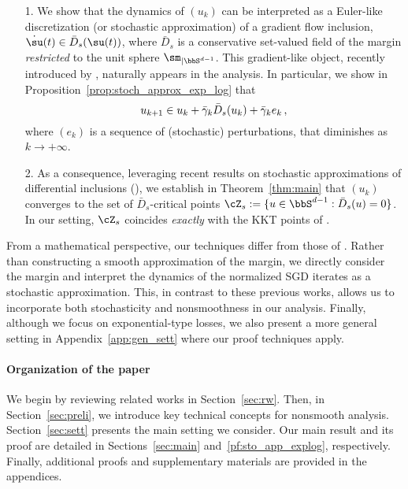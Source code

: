 \begin{itemize}
\item[1.] We show that the dynamics of $(u_k)$ can be interpreted as a Euler-like discretization (or stochastic approximation) of a 
gradient flow inclusion, $\dot{\su}(t) \in  \bar{D}_s(\su(t))$, where $\bar{D}_s$ is a conservative set-valued field of the margin \emph{restricted} to the unit sphere $\sm_{|\bbS^{d-1}}$. This gradient-like object, recently introduced by \cite{bolte2021conservative}, naturally appears in the analysis.
 In particular, we show in Proposition~\ref{prop:stoch_approx_exp_log} that
\begin{equation}\label{eq:sto_appro_intro}
  u_{k+1} \in  u_k + \bar{\gamma}_k \bar{D}_s(u_k) + \bar{\gamma}_k e_k\, ,
\end{equation}
where $(e_k)$ is a sequence of (stochastic) perturbations, that diminishes as $k \rightarrow + \infty$.
\item[2.] As a consequence, leveraging recent results on stochastic approximations of differential inclusions (\cite{benaim2006dynamics,dav-dru-kak-lee-19,bolte2021conservative}), we establish in Theorem~\ref{thm:main} that $(u_k)$ converges to the set of $\bar{D}_s$-critical points $\cZ_s := \{u \in \bbS^{d-1}: \bar{D}_s(u) = 0 \}$. In our setting, $\cZ_s$ coincides \emph{exactly} with the KKT points of \cite{Lyu_Li_maxmargin}.
\end{itemize}
From a mathematical perspective, our techniques differ from those of \cite{Lyu_Li_maxmargin,ji2020directional}. 
Rather than constructing a smooth approximation of the margin, we directly consider the margin and interpret the dynamics of the normalized SGD iterates as a stochastic approximation. This, in contrast to these previous works, allows us to incorporate both stochasticity and nonsmoothness in our analysis. Finally, although we focus on exponential-type losses, we also present a more general setting in Appendix~\ref{app:gen_sett} where our proof techniques apply.

\paragraph{Organization of the paper} We begin by reviewing related works in Section~\ref{sec:rw}. Then, in Section~\ref{sec:preli}, we introduce key technical concepts for nonsmooth analysis. Section~\ref{sec:sett} presents the main setting we consider. Our main result and its proof are detailed in Sections~\ref{sec:main} and~\ref{pf:sto_app_explog}, respectively. Finally, additional proofs and supplementary materials are provided in the appendices.